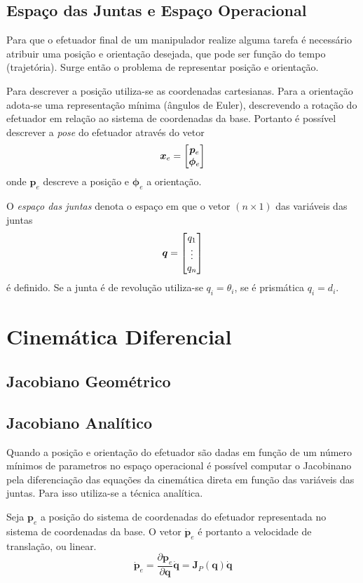 \subsection{Espaço das Juntas e Espaço Operacional}
Para que o efetuador final de um manipulador realize alguma tarefa é necessário atribuir uma posição e orientação desejada, que  pode ser função do tempo (trajetória). Surge então o problema de representar posição e orientação. 

Para descrever a posição utiliza-se as coordenadas cartesianas. Para a orientação adota-se uma representação mínima (ângulos de Euler), descrevendo a rotação do efetuador em relação ao sistema de coordenadas da base. Portanto é possível descrever a \textit{pose} do efetuador através do vetor
\begin{equation} \label{eq:op_space}
\bm{x}_e = \begin{bmatrix} \bm{p}_e \\ \bm{\phi}_e\end{bmatrix}
\end{equation}
onde $\bm{p}_e$ descreve a posição e $\bm{\phi}_e$ a orientação.

O \textit{espaço das juntas} denota o espaço em que o vetor $(n \times 1)$ das variáveis das juntas
\begin{equation} \label{eq:joint_space}
\bm{q} = \begin{bmatrix}q_1 \\ \vdots \\ q_n\end{bmatrix}
\end{equation} 
é definido. Se a junta é de revolução utiliza-se $q_i = \theta_i$, se é prismática $q_i = d_i$.

\section{Cinemática Diferencial}
\subsection{Jacobiano Geométrico}

\subsection{Jacobiano Analítico}
Quando a posição e orientação do efetuador são dadas em função de um número mínimos de parametros no espaço operacional é possível computar o Jacobinano pela diferenciação das equações da cinemática direta em função das variáveis das juntas.
Para isso utiliza-se a técnica analítica.

Seja $\bm{p}_e$ a posição do sistema de coordenadas do efetuador representada no sistema de coordenadas da base. O vetor $\dot{\bm{p}}_e$ é portanto a velocidade de translação, ou linear.
\begin{equation} \label{eq:jacob_pos}
\dot{\bm{p}}_e = \frac{\partial \bm{p}_e }{\partial \bm{q}} \dot{\bm{q}} = \bm{J}_P (\bm{q}) \dot{\bm{q}} 
\end{equation}

